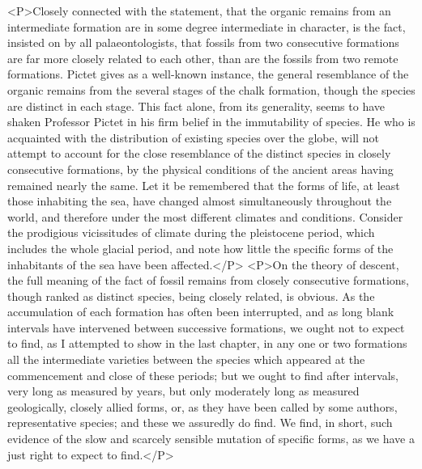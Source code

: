 <P>Closely connected with the statement, that the organic remains from an intermediate formation are in some degree intermediate in character, is the fact, insisted on by all palaeontologists, that fossils from two consecutive formations are far more closely related to each other, than are the fossils from two remote formations. Pictet gives as a well-known instance, the general resemblance of the organic remains from the several stages of the chalk formation, though the species are distinct in each stage.  This fact alone, from its generality, seems to have shaken Professor Pictet in his firm belief in the immutability of species.  He who is acquainted with the distribution of existing species over the globe, will not attempt to account for the close resemblance of the distinct species in closely consecutive formations, by the physical conditions of the ancient areas having remained nearly the same. Let it be remembered that the forms of life, at least those inhabiting the sea, have changed almost simultaneously throughout the world, and therefore under the most different climates and conditions. Consider the prodigious vicissitudes of climate during the pleistocene period, which includes the whole glacial period, and note how little the specific forms of the inhabitants of the sea have been affected.</P>
<P>On the theory of descent, the full meaning of the fact of fossil remains from closely consecutive formations, though ranked as distinct species, being closely related, is obvious. As the accumulation of each formation has often been interrupted, and as long blank intervals have intervened between successive formations, we ought not to expect to find, as I attempted to show in the last chapter, in any one or two formations all the intermediate varieties between the species which appeared at the commencement and close of these periods; but we ought to find after intervals, very long as measured by years, but only moderately long as measured geologically, closely allied forms, or, as they have been called by some authors, representative species; and these we assuredly do find. We find, in short, such evidence of the slow and scarcely sensible mutation of specific forms, as we have a just right to expect to find.</P>

